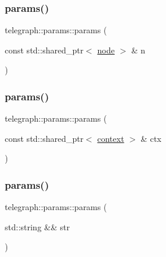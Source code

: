 \mbox{\label{classtelegraph_1_1params_a78343b225800e61b1a9f5a0db2417c49}} 
\subsubsection{\texorpdfstring{params()}{params()}\hspace{0.1cm}{\footnotesize\ttfamily [9/17]}}
{\footnotesize\ttfamily telegraph\+::params\+::params (\begin{DoxyParamCaption}\item[{const std\+::shared\+\_\+ptr$<$ \hyperlink{classtelegraph_1_1node}{node} $>$ \&}]{n }\end{DoxyParamCaption})\hspace{0.3cm}{\ttfamily [inline]}}

\mbox{\label{classtelegraph_1_1params_a18abea3f64064af7363efb4e0f7e28bb}} 
\subsubsection{\texorpdfstring{params()}{params()}\hspace{0.1cm}{\footnotesize\ttfamily [10/17]}}
{\footnotesize\ttfamily telegraph\+::params\+::params (\begin{DoxyParamCaption}\item[{const std\+::shared\+\_\+ptr$<$ \hyperlink{classtelegraph_1_1context}{context} $>$ \&}]{ctx }\end{DoxyParamCaption})\hspace{0.3cm}{\ttfamily [inline]}}

\mbox{\label{classtelegraph_1_1params_acd021c368b92787dee7a852d6b7434b9}} 
\subsubsection{\texorpdfstring{params()}{params()}\hspace{0.1cm}{\footnotesize\ttfamily [11/17]}}
{\footnotesize\ttfamily telegraph\+::params\+::params (\begin{DoxyParamCaption}\item[{std\+::string \&\&}]{str }\end{DoxyParamCaption})\hspace{0.3cm}{\ttfamily [inline]}}

